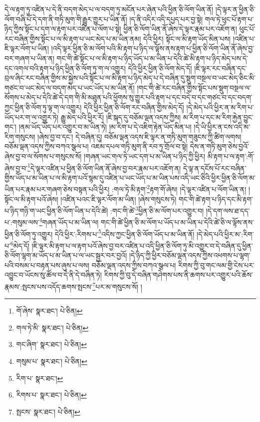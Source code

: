 དེ་ལ་རྟག་ཏུ་འཛིན་པ་དེ་ནི་བདག་མེད་པ་ལ་བདག་ཏུ་མངོན་པར་ཞེན་པའི་ཕྱིན་ཅི་ལོག་ཡིན་ནོ། །དེ་ལྟར་ན་ཕྱིན་ཅི་ལོག་བཞི་པོ་དེ་དག་ནི་གཏི་མུག་གི་རྒྱུར་གྱུར་པ་ཡིན་ནོ། །ད་ནི་འདིར་འདི་དཔྱད་པར་བྱ་སྟེ། གལ་ཏེ་ཕུང་པོ་རྟག་པ་ཉིད་ཀྱིས་སྟོང་པ་དག་ལ་རྟག་པར་འཛིན་པ་ལོག་པ་སྟེ། ཕྱིན་ཅི་ལོག་ཡིན་ནོ་ཞེས་དེ་ལྟར་རྣམ་པར་འཇོག་ན། ཕུང་པོ་རང་བཞིན་གྱིས་སྟོང་པ་ལ་མི་རྟག་པ་ཡང་མེད་པ་མ་ཡིན་ནམ། དེའི་ཕྱིར། སྟོང་ལ་མི་རྟག་ཡོད་མིན་པས། །འཛིན་པ་ཇི་ལྟར་ལོག་པ་ཡིན། །འདི་ལྟར་ཕྱིན་ཅི་མ་ལོག་པའི་མི་རྟག་པ་ཉིད་ལ་ལྟོས་ནས་རྟག་པ་ཕྱིན་ཅི་ལོག་ཡིན་ནོ་ཞེས་བྱ་བར་གཞག་པ་ཡིན་ན། གང་གི་ཚེ་སྟོང་པ་ལ་མི་རྟག་པ་ཉིད་ཡོད་པ་མ་ཡིན་པ་དེའི་ཚེ་མི་རྟག་པ་ཉིད་མེད་པས་དེ་དང་འགལ་བའི་རྟག་པ་ཉིད་ཕྱིན་ཅི་ལོག་ཏུ་ག་ལ་འགྱུར། དེའི་ཕྱིར་ཕྱིན་ཅི་ལོག་མེད་དོ། །ཇི་ལྟར་རང་བཞིན་དང་བྲལ་ཞིང་རང་བཞིན་གྱིས་མ་སྐྱེས་པའི་སྟོང་པ་ལ་མི་རྟག་པ་ཉིད་མེད་པ་དེ་བཞིན་དུ་སྡུག་བསྔལ་བ་ཡང་མེད་ཅིང་མི་གཙང་བ་ཡང་མེད་ལ་བདག་མེད་པ་ཡང་ཡོད་པ་མ་ཡིན་ནོ། །གང་གི་ཚེ་རང་བཞིན་གྱིས་སྟོང་པས་སྡུག་བསྔལ་ལ་སོགས་པ་མེད་པ་དེའི་ཚེ་དེ་དག་གི་མི་མཐུན་པའི་ཕྱོགས་སུ་གྱུར་པའི་རྟག་པ་དང་བདེ་བ་དང་གཙང་བ་དང་བདག་ཀྱང་ཕྱིན་ཅི་ལོག་ཏུ་ལྟ་ག་ལ་འགྱུར། དེའི་ཕྱིར་ཕྱིན་ཅི་ལོག་རང་བཞིན་གྱིས་མེད་དོ། །དེ་མེད་པའི་ཕྱིར་ན་མ་རིག་པ་ཡོད་པར་ག་ལ་འགྱུར་ཏེ། རྒྱུ་མེད་པའི་ཕྱིར་རོ། །ཇི་སྐད་དུ་བཅོམ་ལྡན་འདས་ཀྱིས། མ་རིག་པ་དང་མ་རིག་རྐྱེན་བྱུང་གང་། །ནམ་ཡོད་ཡོད་པར་འགྱུར་བ་མ་ཡིན་ཏེ། །མ་རིག་པ་དེ་འཇིག་རྟེན་ཡོད་མིན་པ། །དེ་ཡི་ཕྱིར་ན་ངས་འདི་མ་རིག་གསུངས། །ཞེས་བྱ་བ་དང་། དེ་བཞིན་དུ། བཅོམ་ལྡན་འདས་ཇི་ལྟར་ན་གཏི་མུག་གཟུངས་ཀྱི་ཚིག་ལགས། བཅོམ་ལྡན་འདས་ཀྱིས་བཀའ་སྩལ་པ། འཇམ་དཔལ་གཏི་མུག་ནི་རབ་ཏུ་གྲོལ་བ་སྟེ། དེས་ན་གཏི་མུག་ཅེས་བྱའོ་ཞེས་བྱ་བ་ལ་སོགས་པ་གསུངས་སོ། །གཞན་ཡང་གལ་ཏེ་ཡང་དག་པ་མ་ཡིན་པ་ཉིད་ཀྱི་ཕྱིར། མི་རྟག་པ་ལ་རྟག་:གོ་ཞེས་བྱ་བ་\footnote{གོ་ཞེས་  སྣར་ཐང་།  པེ་ཅིན། }དེ་ལྟར་འཛིན་པ་ཕྱིན་ཅི་ལོག་ཡིན་ནོ་ཞེས་བྱ་བར་རྣམ་པར་འཇོག་ན། དེ་ལྟ་ན་དངོས་པོ་རང་བཞིན་གྱིས་ཡོད་པ་མ་ཡིན་པ་ལ་མི་རྟག་པའོ་སྙམ་དུ་འཛིན་པ་ཡང་ཡོད་པ་མ་ཡིན་པས་འདི་ཡང་ཅིའི་ཕྱིར་ཕྱིན་ཅི་ལོག་མ་ཡིན་པར་རྣམ་པར་གཞག་ཅེས་བསྟན་པའི་ཕྱིར། :གལ་ཏེ་མི་རྟག་\footnote{གལ་ཏེ་མི་  སྣར་ཐང་།  པེ་ཅིན། }རྟག་གོ་ཞེས། །དེ་ལྟར་འཛིན་པ་ལོག་ཡིན་ན། །སྟོང་ལ་མི་རྟག་པའོ་ཞེས། །འཛིན་པའང་ཇི་ལྟར་ལོག་མ་ཡིན། །ཞེས་གསུངས་ཏེ། གང་གི་ཚེ་རྟག་པ་ཉིད་དང་མི་རྟག་པ་ཉིད་གཉི་ག་ཡང་ཕྱིན་ཅི་ལོག་ཡིན་པ་དེའི་ཚེ། :གང་གི་ཚེ་\footnote{གང་ཞིག་  སྣར་ཐང་།  པེ་ཅིན། }ཕྱིན་ཅི་མ་ལོག་པར་འགྱུར་བ། །དེ་དག་ལས་ཐ་དད་པ་:གསུམ་ལས་\footnote{གསུམ་པ་  སྣར་ཐང་།  པེ་ཅིན། }གཞན་ཡོད་པ་མ་ཡིན་ལ། གང་གི་ཚེ་ཕྱིན་ཅི་མ་ལོག་པ་ཡོད་པ་མ་ཡིན་པ་དེའི་ཚེ་ཅི་ལ་ལྟོས་ནས་ཕྱིན་ཅི་ལོག་ཏུ་འགྱུར། དེའི་ཕྱིར་:རིགས་པ་\footnote{རིག་པ་  སྣར་ཐང་། }འདིས་ཀྱང་ཕྱིན་ཅི་ལོག་ཡོད་པ་མ་ཡིན་ནོ། །དེ་མེད་པའི་ཕྱིར་མ་:རིག་པ་\footnote{རིགས་པ་  སྣར་ཐང་།  པེ་ཅིན། }མེད་དོ། །ཇི་ལྟར་མི་རྟག་པ་ལ་རྟག་པའོ་ཞེས་བྱ་བར་འཛིན་པ་འདི་ཕྱིན་ཅི་ལོག་ཏུ་མི་འགྱུར་བ་དེ་བཞིན་དུ་ཕྱིན་ཅི་ལོག་ལྷག་མ་ཡོད་པ་མ་ཡིན་པ་ལ་ཡང་སྦྱར་བར་བྱའོ། །དེ་ཉིད་ཀྱི་ཕྱིར་བཅོམ་ལྡན་འདས་ཀྱིས་འཕགས་པ་ལྷག་པའི་བསམ་པ་བརྟན་པས་ཞུས་པ་ལས། བཅོམ་ལྡན་འདས་ཀྱིས་བཀའ་སྩལ་པ། རིགས་ཀྱི་བུ་གང་ལམ་གྱི་ངེས་པར་འབྱུང་བ་ཡོངས་སུ་ཚོལ་བ་དེ་ནི་དེ་བཞིན་ཏེ། རིགས་ཀྱི་བུ་དེ་བཞིན་གཤེགས་པས་ནི་ཆགས་པར་འགྱུར་པའི་ཆོས་རྣམས་:སྤངས་པས་འདོད་ཆགས་སྤངས་\footnote{སྤངས་  སྣར་ཐང་།  པེ་ཅིན། }པར་མ་གསུངས་སོ། །
